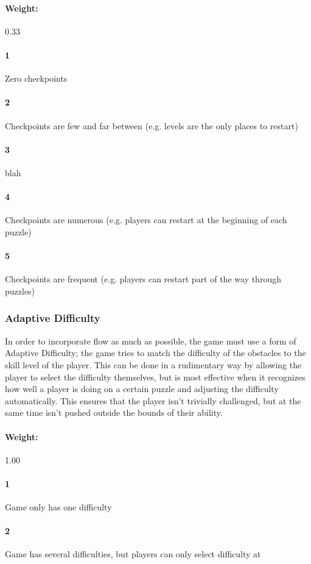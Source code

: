 \paragraph{Weight:}{0.33}\paragraph{1}Zero checkpoints\paragraph{2}Checkpoints are few and far between (e.g. levels are the only places to restart)\paragraph{3}blah\paragraph{4}Checkpoints are numerous (e.g. players can restart at the beginning of each puzzle)\paragraph{5}Checkpoints are frequent (e.g. players can restart part of the way through puzzles)\subsubsection{Adaptive Difficulty}{In order to incorporate flow as much as possible, the game must use a form of Adaptive Difficulty; the game tries to match the difficulty of the obstacles to the skill level of the player. This can be done in a rudimentary way by allowing the player to select the difficulty themselves, but is most effective when it recognizes how well a player is doing on a certain puzzle and adjusting the difficulty automatically. This ensures that the player isn't trivially challenged, but at the same time isn't pushed outside the bounds of their ability.} \paragraph{Weight:}{1.00}\paragraph{1}Game only has one difficulty\paragraph{2}Game has several difficulties, but players can only select difficulty at 